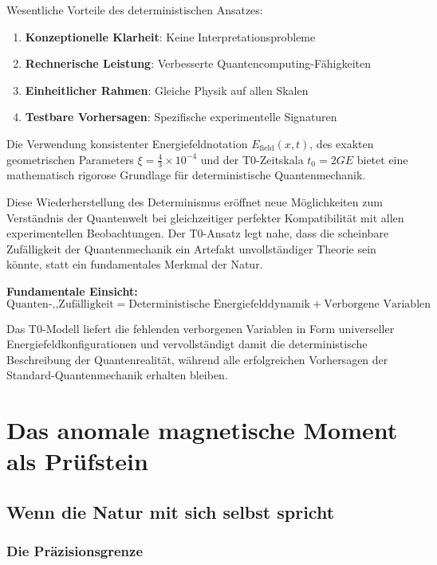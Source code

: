 \documentclass[12pt,a4paper]{report}
\begin{document}
	Wesentliche Vorteile des deterministischen Ansatzes:
	\begin{enumerate}
		\item \textbf{Konzeptionelle Klarheit}: Keine Interpretationsprobleme
		\item \textbf{Rechnerische Leistung}: Verbesserte Quantencomputing-Fähigkeiten
		\item \textbf{Einheitlicher Rahmen}: Gleiche Physik auf allen Skalen
		\item \textbf{Testbare Vorhersagen}: Spezifische experimentelle Signaturen
	\end{enumerate}
	
	Die Verwendung konsistenter Energiefeldnotation $E_{\text{field}}(x,t)$, des exakten geometrischen Parameters $\xi = \frac{4}{3} \times 10^{-4}$ und der T0-Zeitskala $t_0 = 2GE$ bietet eine mathematisch rigorose Grundlage für deterministische Quantenmechanik.
	
	Diese Wiederherstellung des Determinismus eröffnet neue Möglichkeiten zum Verständnis der Quantenwelt bei gleichzeitiger perfekter Kompatibilität mit allen experimentellen Beobachtungen. Der T0-Ansatz legt nahe, dass die scheinbare Zufälligkeit der Quantenmechanik ein Artefakt unvollständiger Theorie sein könnte, statt ein fundamentales Merkmal der Natur.
	
	\textbf{Fundamentale Einsicht:}
	\begin{equation}
		\boxed{\text{Quanten-,,Zufälligkeit} = \text{Deterministische Energiefelddynamik} + \text{Verborgene Variablen}}
	\end{equation}
	
	Das T0-Modell liefert die fehlenden verborgenen Variablen in Form universeller Energiefeldkonfigurationen und vervollständigt damit die deterministische Beschreibung der Quantenrealität, während alle erfolgreichen Vorhersagen der Standard-Quantenmechanik erhalten bleiben.
	\chapter{Das anomale magnetische Moment als Prüfstein}
	\label{chap:anomalous_magnetic_moment}
	
	\section{Wenn die Natur mit sich selbst spricht}
	\label{sec:nature_speaks}
	
	\subsection{Die Präzisionsgrenze}
	\label{subsec:precision_frontier}
	
\end{document}
